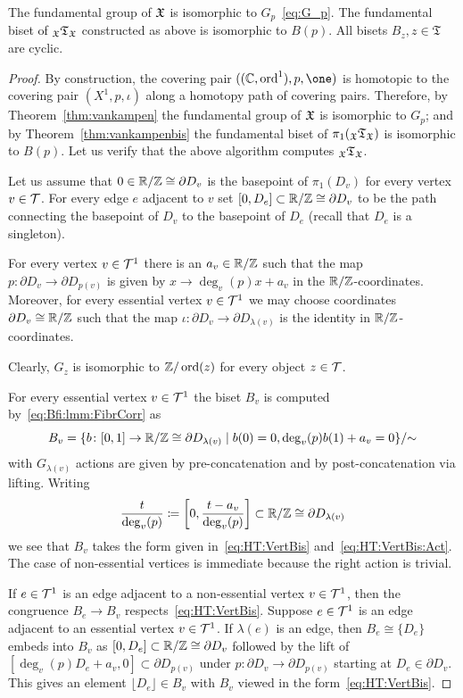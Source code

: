 \documentclass{amsart}
\begin{document}
\begin{thm}\label{thm:GrBsOutOfHT}
  The fundamental group of ${\mathfrak X}$ is isomorphic to $G_p$~\eqref{eq:G_p}. The
  fundamental biset of ${}_{\mathfrak X}{\mathfrak T}_{{\mathfrak X}}$ constructed as above is
  isomorphic to $B(p)$. All bisets $B_z, z\in \mathfrak T$ are cyclic.
\end{thm}
\begin{proof}
  By construction, the covering pair $((\C,\ord^1), p,\one)$ is
  homotopic to the covering pair $(X^1,p,\iota)$ along a homotopy path of
  covering pairs. Therefore, by Theorem~\ref{thm:vankampen} the fundamental
  group of ${\mathfrak X}$ is isomorphic to $G_p$; and by
  Theorem~\ref{thm:vankampenbis} the fundamental biset of
  $\pi_1({}_{\mathfrak X}{\mathfrak T}_{{\mathfrak X}})$ is isomorphic to $B(p)$. Let us verify
  that the above algorithm computes ${}_{\mathfrak X}{\mathfrak T}_{{\mathfrak X}}$.

  Let us assume that $0\in {\mathbb R}/{\mathbb Z}\cong \partial D_v$ is the basepoint of
  $\pi_1(D_v)$ for every vertex $v\in {\mathcal T}$. For every edge $e$ adjacent to
  $v$ set $[0,D_e]\subset {\mathbb R}/{\mathbb Z}\cong \partial D_v$ to be the path
  connecting the basepoint of $D_v$ to the basepoint of $D_e$ (recall that
  $D_e$ is a singleton).

  For every vertex $v\in {\mathcal T}^1$ there is an $a_v\in {\mathbb R}/{\mathbb Z}$ such that the
  map $p\colon\partial D_v\to\partial D_{p(v)}$ is given by $x\to
  \deg_v(p) x+ a_v$ in the ${\mathbb R}/{\mathbb Z}$-coordinates. Moreover, for every
  essential vertex $v\in {\mathcal T}^1$ we may choose coordinates $\partial
  D_{v}\cong {\mathbb R}/{\mathbb Z}$ such that the map $\iota\colon\partial D_v\to\partial
  D_{\lambda(v)}$ is the identity in ${\mathbb R}/{\mathbb Z}$-coordinates.

  Clearly, $G_z$ is isomorphic to ${\mathbb Z}/\operatorname{ord}(z)$ for every object $z\in {\mathcal T}$.

  For every essential vertex $v\in {\mathcal T}^1$ the biset $B_v$ is computed
  by~\eqref{eq:Bfi:lmm:FibrCorr} as
  \[B_v=\{b\colon[0,1]\to{\mathbb R}/{\mathbb Z}\cong \partial D_{\lambda(v)}\mid b(0)=0 ,
  \deg_v(p)b(1)+a_v=0\}/{\sim}
  \]
  with $G_{\lambda(v)}$ actions are given by pre-concatenation and by
  post-concatenation via
  lifting. Writing
  \[\frac{t}{\deg_v(p)}\coloneqq\left[0,\frac{t-a_v}{\deg_v(p)}\right]\subset
  {\mathbb R}/{\mathbb Z}\cong \partial D_{\lambda (v)}
  \]
  we see that $B_v$ takes the form given in~\eqref{eq:HT:VertBis}
  and~\eqref{eq:HT:VertBis:Act}. The case of non-essential vertices is
  immediate because the right action is trivial.

  If $e\in {\mathcal T}^1$ is an edge adjacent to a non-essential vertex $v\in
  {\mathcal T}^1$, then the congruence $B_e\to B_v$
  respects~\eqref{eq:HT:VertBis}. Suppose $e\in {\mathcal T}^1$ is an edge adjacent
  to an essential vertex $v\in {\mathcal T}^1$. If $\lambda(e)$ is an edge, then
  $B_e\cong \{D_e\}$ embeds into $B_v$ as $ [0,D_{e} ]\subset {\mathbb R}/{\mathbb Z}
  \cong\partial D_{v}$ followed by the lift of $[\deg_{v}(p) D_{e}+a_v,
  0]\subset \partial D_{p(v)}$ under $p\colon \partial D_v\to\partial
  D_{p(v)}$ starting at $D_{e}\in \partial D_v$. This gives an element
  $\lfloor D_e\rfloor \in B_v$ with $B_v$ viewed in the
  form~\eqref{eq:HT:VertBis}.


\end{proof}
\end{document}
